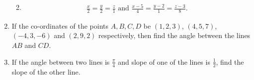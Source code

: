 \begin{enumerate}[label=\thesubsection.\arabic*, ref=\thesubsection.\theenumi]
\begin{enumerate}
\begin{align}
\end{align}
\item
\begin{align} \frac{x}{2}=\frac{y}{2}=\frac{z}{1}\text{ and } \frac{x-5}{4}=\frac{y-2}{1}=\frac{z-3}{8}.
\end{align}
\end{enumerate}
\item If the co-ordinates of the points $A, B, C, D$ be $(1, 2, 3)$,  $(4, 5, 7)$,  $(-4, 3, -6)$ and $(2, 9, 2)$ respectively,  then find the angle between the lines $AB$ and $CD$.
\item If the angle between two lines is $\frac{\pi}{4}$ and slope of one of the lines is $\frac{1}{2}$, find the slope of the other line.
\end{enumerate}
